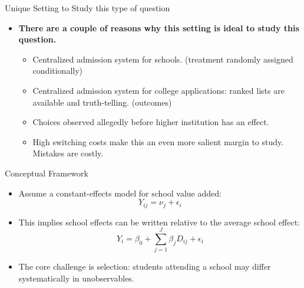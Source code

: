 \documentclass[notes,11pt, aspectratio=169]{beamer}
\newenvironment{wideitemize}{%
  \begin{minipage}{0.90\textwidth}
  \begin{itemize}
  \addtolength{\itemsep}{1em}
}{%
  \end{itemize}
  \end{minipage}
}
\let\oldparencite\parencite
\renewcommand{\parencite}[2][]{%
  \footnotesize {\tiny \oldparencite[#1]{#2}} \normalsize %
}
\begin{document}
\begin{frame}{Unique Setting to Study this type of question}
\begin{wideitemize}

\item \textbf{ There are a couple of reasons why this setting is ideal to study this question.}
    \begin{itemize}
    \item Centralized admission system for schools. (treatment randomly assigned conditionally)
    \item Centralized admission system for college applications: ranked lists are available and truth-telling. (outcomes)
    \item Choices observed allegedly before higher institution has an effect. 
    \item High switching costs make this an even more salient margin to study. Mistakes are costly.
 
    \end{itemize}
 
 \end{wideitemize}
\end{frame}



\begin{frame}{Conceptual Framework}
\begin{itemize}
    \item Assume a constant-effects model for school value added:
    \[
    Y_{ij} = \nu_j + \epsilon_i
    \]
    \item This implies school effects can be written relative to the average school effect:
    \[
    Y_i = \beta_0 + \sum_{j=1}^J \beta_j D_{ij} + \epsilon_i
    \]
    \item The core challenge is selection: students attending a school may differ systematically in unobservables.
\end{itemize}
\end{frame}
\end{document}
